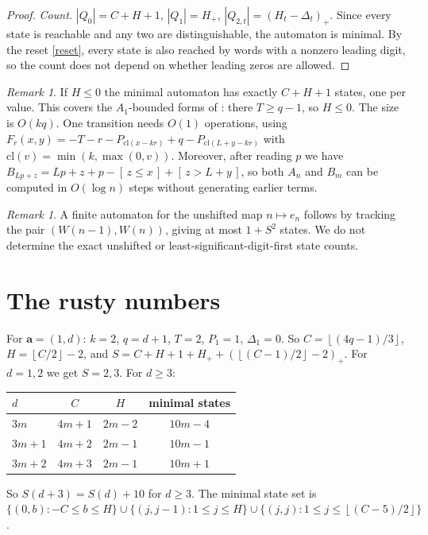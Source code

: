 \documentclass[11pt]{article}
\theoremstyle{remark}\newtheorem{remark}[theorem]{Remark}
\theoremstyle{definition}\newtheorem{definition}[theorem]{Definition}
\newcommand{\fl}[1]{\left\lfloor #1\right\rfloor}
\newcommand{\ind}[1]{[\,#1\,]}
\begin{document}
\begin{proof}
\emph{Count.} \(|Q_0|=C+H+1\), \(|Q_1|=H_+\), \(|Q_{2,t}|=(H_t-\Delta_t)_+\). Since every state is reachable and any two are distinguishable, the automaton is minimal. By the reset \eqref{reset}, every state is also reached by words with a nonzero leading digit, so the count does not depend on whether leading zeros are allowed.
\end{proof}

\begin{remark}
If \(H\le0\) the minimal automaton has exactly \(C+H+1\) states, one per value. This covers the \(A_1\)-bounded forms of \cite{fj}: there \(T\ge q-1\), so \(H\le0\). The size is \(O(kq)\). One transition needs \(O(1)\) operations, using \(F_r(x,y)=-T-r-P_{\mathrm{cl}(x-kr)}+q-P_{\mathrm{cl}(L+y-kr)}\) with \(\mathrm{cl}(v)=\min(k,\max(0,v))\). Moreover, after reading \(p\) we have \(B_{Lp+z}=Lp+z+p-\ind{z\le x}+\ind{z>L+y}\), so both \(A_n\) and \(B_m\) can be computed in \(O(\log n)\) steps without generating earlier terms.
\end{remark}

\begin{remark}
A finite automaton for the unshifted map \(n\mapsto e_n\) follows by tracking the pair \((W(n-1),W(n))\), giving at most \(1+S^2\) states. We do not determine the exact unshifted or least-significant-digit-first state counts.
\end{remark}

\section{The rusty numbers}
For \(\mathbf a=(1,d)\): \(k=2\), \(q=d+1\), \(T=2\), \(P_1=1\), \(\Delta_1=0\). So \(C=\fl{(4q-1)/3}\), \(H=\fl{C/2}-2\), and \(S=C+H+1+H_++(\fl{(C-1)/2}-2)_+\). For \(d=1,2\) we get \(S=2,3\). For \(d\ge3\):
\begin{center}
\begin{tabular}{lccc}\toprule
\(d\) & \(C\) & \(H\) & minimal states\\\midrule
\(3m\) & \(4m+1\) & \(2m-2\) & \(10m-4\)\\
\(3m+1\) & \(4m+2\) & \(2m-1\) & \(10m-1\)\\
\(3m+2\) & \(4m+3\) & \(2m-1\) & \(10m+1\)\\\bottomrule
\end{tabular}
\end{center}
So \(S(d+3)=S(d)+10\) for \(d\ge3\). The minimal state set is \(\{(0,b):-C\le b\le H\}\cup\{(j,j-1):1\le j\le H\}\cup\{(j,j):1\le j\le\fl{(C-5)/2}\}\).
\end{document}
